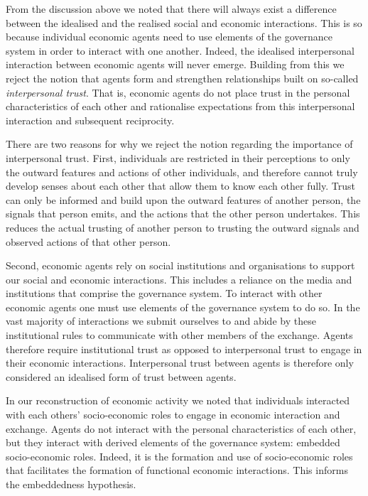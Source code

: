 \begin{subappendices}
From the discussion above we noted that there will always exist a difference between the idealised and the realised social and economic interactions. This is so because individual economic agents need to use elements of the governance system in order to interact with one another. Indeed, the idealised interpersonal interaction between economic agents will never emerge. Building from this we reject the notion that agents form and strengthen relationships built on so-called \emph{interpersonal trust}. That is, economic agents do not place trust in the personal characteristics of each other and rationalise expectations from this interpersonal interaction and subsequent reciprocity.

There are two reasons for why we reject the notion regarding the importance of interpersonal trust. First, individuals are restricted in their perceptions to only the outward features and actions of other individuals, and therefore cannot truly develop senses about each other that allow them to know each other fully. Trust can only be informed and build upon the outward features of another person, the signals that person emits, and the actions that the other person undertakes. This reduces the actual trusting of another person to trusting the outward signals and observed actions of that other person.

Second, economic agents rely on social institutions and organisations to support our social and economic interactions. This includes a reliance on the media and institutions that comprise the governance system. To interact with other economic agents one must use elements of the governance system to do so. In the vast majority of interactions we submit ourselves to and abide by these institutional rules to communicate with other members of the exchange. Agents therefore require institutional trust as opposed to interpersonal trust to engage in their economic interactions. Interpersonal trust between agents is therefore only considered an idealised form of trust between agents.

\medskip\noindent In our reconstruction of economic activity we noted that individuals interacted with each others' socio-economic roles to engage in economic interaction and exchange. Agents do not interact with the personal characteristics of each other, but they interact with derived elements of the governance system: embedded socio-economic roles. Indeed, it is the formation and use of socio-economic roles that facilitates the formation of functional economic interactions. This informs the embeddedness hypothesis.


\end{subappendices}
